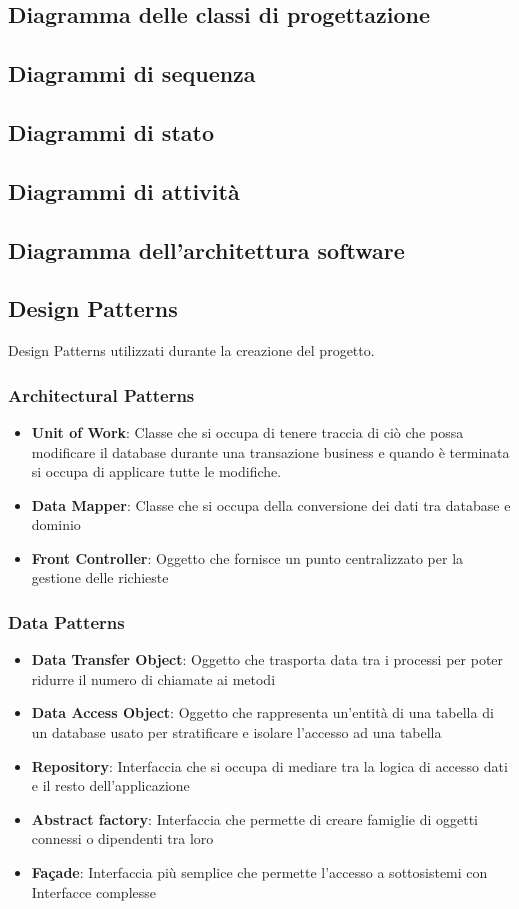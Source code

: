 \documentclass[12pt]{article}
\begin{document}
\subsection{Diagramma delle classi di progettazione}
\subsection{Diagrammi di sequenza}
\subsection{Diagrammi di stato}
\subsection{Diagrammi di attivit\`{a}}
\subsection{Diagramma dell'architettura software}
\subsection{Design Patterns}
Design Patterns utilizzati durante la creazione del progetto.
\subsubsection{Architectural Patterns}
	\begin{itemize}
		\item \textbf{Unit of Work}: Classe che si occupa di tenere traccia di ciò che possa modificare il database durante una transazione business e quando è terminata si occupa di applicare tutte le modifiche.
		\item \textbf{Data Mapper}: Classe che si occupa della conversione dei dati tra database e dominio
		\item \textbf{Front Controller}: Oggetto che fornisce un punto centralizzato per la gestione delle richieste
	\end{itemize}
\subsubsection{Data Patterns}
	\begin{itemize}
		\item \textbf{Data Transfer Object}: Oggetto che trasporta data tra i processi per poter ridurre il numero di chiamate ai metodi
		\item \textbf{Data Access Object}: Oggetto che rappresenta un'entità di una tabella di un database usato per stratificare e isolare l'accesso ad una tabella
		\item \textbf{Repository}: Interfaccia che si occupa di mediare tra la logica di accesso dati e il resto dell'applicazione
		\item \textbf{Abstract factory}: Interfaccia che permette di creare famiglie di oggetti connessi o dipendenti tra loro
		\item \textbf{Façade}: Interfaccia più semplice che permette l'accesso a sottosistemi con Interfacce complesse
	\end{itemize}
\end{document}
